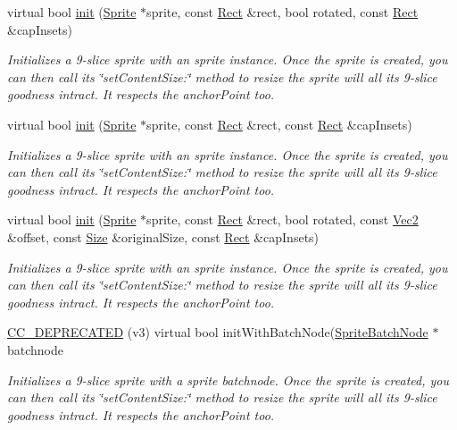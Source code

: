\begin{DoxyCompactItemize}
\item 
virtual bool \hyperlink{classui_1_1Scale9Sprite_ade7eafd727d7d889eb1d6aa87200a18f}{init} (\hyperlink{classSprite}{Sprite} $\ast$sprite, const \hyperlink{classRect}{Rect} \&rect, bool rotated, const \hyperlink{classRect}{Rect} \&cap\+Insets)
\begin{DoxyCompactList}\small\item\em Initializes a 9-\/slice sprite with an sprite instance. Once the sprite is created, you can then call its \char`\"{}set\+Content\+Size\+:\char`\"{} method to resize the sprite will all it\textquotesingle{}s 9-\/slice goodness intract. It respects the anchor\+Point too. \end{DoxyCompactList}\item 
virtual bool \hyperlink{classui_1_1Scale9Sprite_ad2af07095657c86137b04d54317ac02f}{init} (\hyperlink{classSprite}{Sprite} $\ast$sprite, const \hyperlink{classRect}{Rect} \&rect, const \hyperlink{classRect}{Rect} \&cap\+Insets)
\begin{DoxyCompactList}\small\item\em Initializes a 9-\/slice sprite with an sprite instance. Once the sprite is created, you can then call its \char`\"{}set\+Content\+Size\+:\char`\"{} method to resize the sprite will all it\textquotesingle{}s 9-\/slice goodness intract. It respects the anchor\+Point too. \end{DoxyCompactList}\item 
virtual bool \hyperlink{classui_1_1Scale9Sprite_aeac01b15bd246397ca3e5b1042f96b6d}{init} (\hyperlink{classSprite}{Sprite} $\ast$sprite, const \hyperlink{classRect}{Rect} \&rect, bool rotated, const \hyperlink{classVec2}{Vec2} \&offset, const \hyperlink{classSize}{Size} \&original\+Size, const \hyperlink{classRect}{Rect} \&cap\+Insets)
\begin{DoxyCompactList}\small\item\em Initializes a 9-\/slice sprite with an sprite instance. Once the sprite is created, you can then call its \char`\"{}set\+Content\+Size\+:\char`\"{} method to resize the sprite will all it\textquotesingle{}s 9-\/slice goodness intract. It respects the anchor\+Point too. \end{DoxyCompactList}\item 
\hyperlink{classui_1_1Scale9Sprite_ac7989890a826ab703510c852f87e9ebe}{C\+C\+\_\+\+D\+E\+P\+R\+E\+C\+A\+T\+ED} (v3) virtual bool init\+With\+Batch\+Node(\hyperlink{classSpriteBatchNode}{Sprite\+Batch\+Node} $\ast$batchnode
\begin{DoxyCompactList}\small\item\em Initializes a 9-\/slice sprite with a sprite batchnode. Once the sprite is created, you can then call its \char`\"{}set\+Content\+Size\+:\char`\"{} method to resize the sprite will all it\textquotesingle{}s 9-\/slice goodness intract. It respects the anchor\+Point too. \end{DoxyCompactList}\item 

\end{DoxyCompactItemize}
